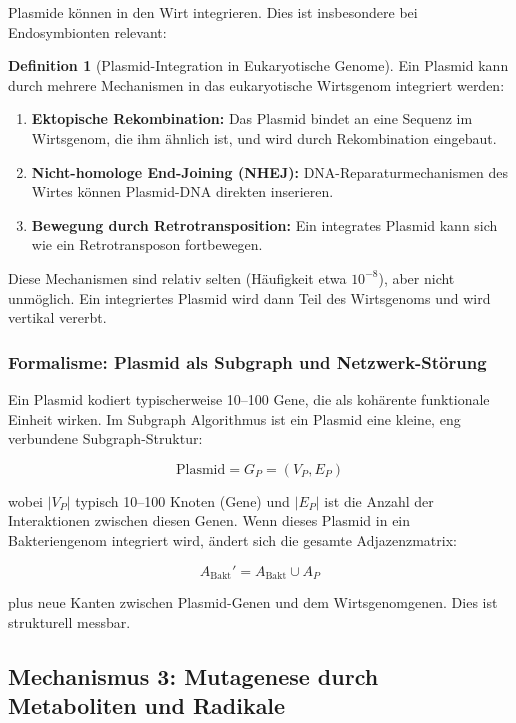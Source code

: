 \documentclass[a4paper,12pt]{article}
\theoremstyle{definition}
\newtheorem{definition}{Definition}
\begin{document}
Plasmide können in den Wirt integrieren. Dies ist insbesondere bei Endosymbionten relevant:

\begin{definition}[Plasmid-Integration in Eukaryotische Genome]
Ein Plasmid kann durch mehrere Mechanismen in das eukaryotische Wirtsgenom integriert werden:
\begin{enumerate}
    \item \textbf{Ektopische Rekombination:} Das Plasmid bindet an eine Sequenz im Wirtsgenom, die ihm ähnlich ist, und wird durch Rekombination eingebaut.
    \item \textbf{Nicht-homologe End-Joining (NHEJ):} DNA-Reparaturmechanismen des Wirtes können Plasmid-DNA direkten inserieren.
    \item \textbf{Bewegung durch Retrotransposition:} Ein integrates Plasmid kann sich wie ein Retrotransposon fortbewegen.
\end{enumerate}

Diese Mechanismen sind relativ selten (Häufigkeit etwa $10^{-8}$), aber nicht unmöglich. Ein integriertes Plasmid wird dann Teil des Wirtsgenoms und wird vertikal vererbt.
\end{definition}

\subsubsection{Formalisme: Plasmid als Subgraph und Netzwerk-Störung}

Ein Plasmid kodiert typischerweise 10--100 Gene, die als kohärente funktionale Einheit wirken. Im Subgraph Algorithmus ist ein Plasmid eine kleine, eng verbundene Subgraph-Struktur:

\[
\text{Plasmid} = G_P = (V_P, E_P)
\]

wobei $|V_P|$ typisch 10--100 Knoten (Gene) und $|E_P|$ ist die Anzahl der Interaktionen zwischen diesen Genen. Wenn dieses Plasmid in ein Bakteriengenom integriert wird, ändert sich die gesamte Adjazenzmatrix:

\[
A_{\text{Bakt}}' = A_{\text{Bakt}} \cup A_{P}
\]

plus neue Kanten zwischen Plasmid-Genen und dem Wirtsgenomgenen. Dies ist strukturell messbar.

\subsection{Mechanismus 3: Mutagenese durch Metaboliten und Radikale}
\end{document}
